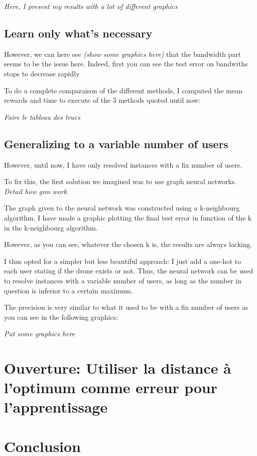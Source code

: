 \documentclass[letterpaper]{article}
\begin{document}
\begin{multicols}{2}
\textit{Here, I present my results with a lot of different graphics}

\subsection{Learn only what's necessary}

However, we can here see \textit{(show some graphics here)} that the bandwidth part seems to be the issue here.
Indeed, first you can see the test error on bandwiths stops to decrease rapidly

To do a complete comparaison of the different methods, I computed the mean rewards and time to execute of the 3 methods quoted until now:

\textit{Faire le tableau des trucs}

\subsection{Generalizing to a variable number of users}

However, until now, I have only resolved instances with a fix number of users.

To fix this, the first solution we imagined was to use graph neural networks.
\textit{Detail how gnn work}

The graph given to the neural network was constructed using a k-neighbourg algorithm.
I have made a graphic plotting the final test error in function of the k in the k-neighbourg algorithm.

However, as you can see, whatever the chosen k is, the results are always lacking.

I thus opted for a simpler but less beautiful approach: I just add a one-hot to each user stating if the drone exists or not.
Thus, the neural network can be used to resolve instances with a variable number of users, as long as the number in question is inferior to a certain maximum.

The precision is very similar to what it used to be with a fix number of users as you can see in the following graphics:

\textit{Put some graphics here}

\section{Ouverture: Utiliser la distance à l'optimum comme erreur pour l'apprentissage}

\section{Conclusion}

\end{multicols}
\end{document}
